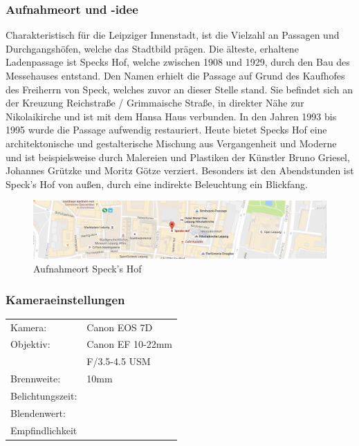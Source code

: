 \documentclass[liststotoc,bibtotoc,fontsize=14pt,]{scrreprt}
\begin{document}
			\subsubsection{Aufnahmeort und -idee}
						Charakteristisch für die Leipziger Innenstadt, ist die Vielzahl an Passagen und Durchgangshöfen, welche das Stadtbild prägen. Die älteste, erhaltene Ladenpassage ist Speck\grq s Hof, welche zwischen 1908 und 1929, durch den Bau des Messehauses entstand. Den Namen erhielt die Passage auf Grund des Kaufhofes des Freiherrn von Speck, welches zuvor an dieser Stelle stand. Sie befindet sich an der Kreuzung Reichstraße / Grimmaische Straße, in direkter Nähe zur Nikolaikirche und ist mit dem Hansa Haus verbunden. In den Jahren 1993 bis 1995 wurde die Passage aufwendig restauriert. Heute bietet Speck\grq s Hof eine architektonische und gestalterische Mischung aus Vergangenheit und Moderne und ist beispielsweise durch Malereien und Plastiken der Künstler Bruno Griesel, Johannes Grützke und Moritz Götze verziert. Besonders ist den Abendstunden ist Speck's Hof von außen, durch eine indirekte Beleuchtung ein Blickfang. 

\begin{figure}[H]
	\includegraphics[width=\linewidth]{img/places/sh_map.jpg}
	\caption{Aufnahmeort Speck's Hof}
	\label{img:sh_map}
\end{figure}

\subsubsection{Kameraeinstellungen}
\begin{minipage}{0.58\textwidth}
	\begin{tabular}{ll}
		Kamera: &Canon EOS 7D \\
		Objektiv: &Canon EF 10-22mm \\
		& F/3.5-4.5 USM\\		
		Brennweite:&  10mm \\
		Belichtungszeit: &  \\
		Blendenwert: & \\
		Empfindlichkeit & \\
	\end{tabular}\\
\end{minipage}%
\begin{minipage}{0.42\textwidth}
	
\end{minipage}%
		
\end{document}
